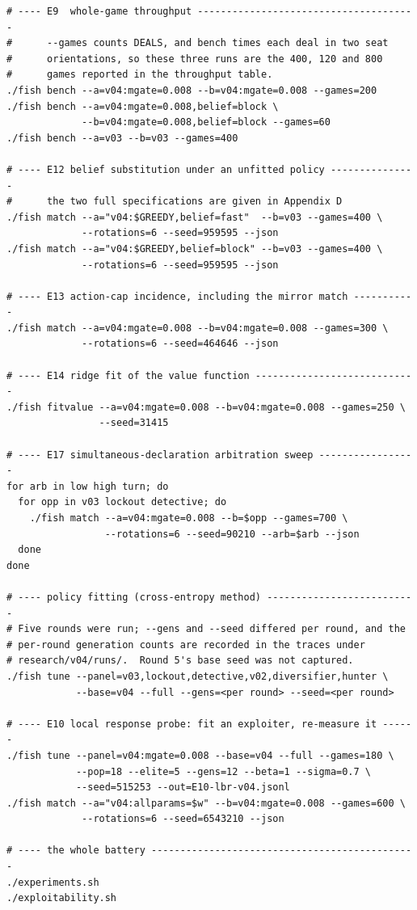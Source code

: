 \documentclass[11pt]{article}
\theoremstyle{definition}
\begin{document}
\begin{verbatim}
# ---- E9  whole-game throughput --------------------------------------
#      --games counts DEALS, and bench times each deal in two seat
#      orientations, so these three runs are the 400, 120 and 800
#      games reported in the throughput table.
./fish bench --a=v04:mgate=0.008 --b=v04:mgate=0.008 --games=200
./fish bench --a=v04:mgate=0.008,belief=block \
             --b=v04:mgate=0.008,belief=block --games=60
./fish bench --a=v03 --b=v03 --games=400

# ---- E12 belief substitution under an unfitted policy ---------------
#      the two full specifications are given in Appendix D
./fish match --a="v04:$GREEDY,belief=fast"  --b=v03 --games=400 \
             --rotations=6 --seed=959595 --json
./fish match --a="v04:$GREEDY,belief=block" --b=v03 --games=400 \
             --rotations=6 --seed=959595 --json

# ---- E13 action-cap incidence, including the mirror match -----------
./fish match --a=v04:mgate=0.008 --b=v04:mgate=0.008 --games=300 \
             --rotations=6 --seed=464646 --json

# ---- E14 ridge fit of the value function ----------------------------
./fish fitvalue --a=v04:mgate=0.008 --b=v04:mgate=0.008 --games=250 \
                --seed=31415

# ---- E17 simultaneous-declaration arbitration sweep -----------------
for arb in low high turn; do
  for opp in v03 lockout detective; do
    ./fish match --a=v04:mgate=0.008 --b=$opp --games=700 \
                 --rotations=6 --seed=90210 --arb=$arb --json
  done
done

# ---- policy fitting (cross-entropy method) --------------------------
# Five rounds were run; --gens and --seed differed per round, and the
# per-round generation counts are recorded in the traces under
# research/v04/runs/.  Round 5's base seed was not captured.
./fish tune --panel=v03,lockout,detective,v02,diversifier,hunter \
            --base=v04 --full --gens=<per round> --seed=<per round>

# ---- E10 local response probe: fit an exploiter, re-measure it ------
./fish tune --panel=v04:mgate=0.008 --base=v04 --full --games=180 \
            --pop=18 --elite=5 --gens=12 --beta=1 --sigma=0.7 \
            --seed=515253 --out=E10-lbr-v04.jsonl
./fish match --a="v04:allparams=$w" --b=v04:mgate=0.008 --games=600 \
             --rotations=6 --seed=6543210 --json

# ---- the whole battery ----------------------------------------------
./experiments.sh
./exploitability.sh
\end{verbatim}
\end{document}
